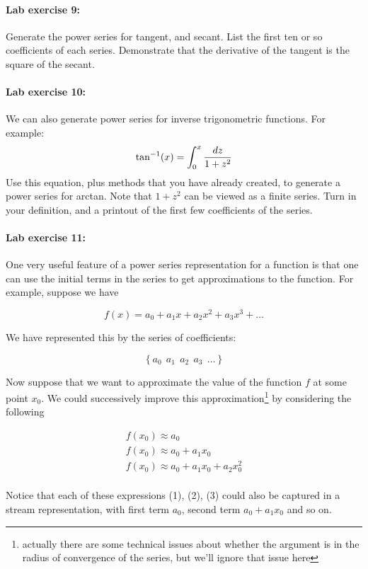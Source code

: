 \paragraph{Lab exercise 9:} Generate the power series for tangent,
and secant.  List the first ten or so coefficients of each
series.  Demonstrate that the derivative of the tangent is the square
of the secant.

\paragraph{Lab exercise 10:}  We can also generate power series for
inverse trigonometric functions.  For example:
\[\tan^{-1}(x) = \int_0^x {dz \over {1 + z^2}}\]
Use this equation, plus methods that you have already created, to
generate a power series for arctan.
Note that $1+z^2$ can be viewed as a finite series.
Turn in your definition, and a
printout of the first few coefficients of the series.

\paragraph{Lab exercise 11:}  One very useful feature of a power
series representation for a function is that one can use the initial
terms in the series to get approximations to the function.  For
example, suppose we have

\[f(x) = a_0 + a_1x + a_2 x^2 + a_3 x^3 + \ldots\]

We have represented this by the series of coefficients:

\[\left\{a_0\ \ a_1\ \ a_2 \ \ a_3 \ \ \ldots\right\}\]

Now suppose that we want to approximate the value of the function $f$
at some point $x_0$.  We could successively improve this
approximation\footnote{actually there are some technical issues
about whether the argument is in the radius of convergence of the
series, but we'll ignore that issue here} by considering the following

\begin{eqnarray} f(x_0) \approx a_0\\ f(x_0) \approx a_0 + a_1 x_0\\
f(x_0) \approx a_0 + a_1 x_0 + a_2 x_0^2\\
\end{eqnarray}

Notice that each of these expressions (1), (2), (3) could also be captured in a
stream representation, with first term $a_0$, second term $a_0 + a_1
x_0$ and so on.

